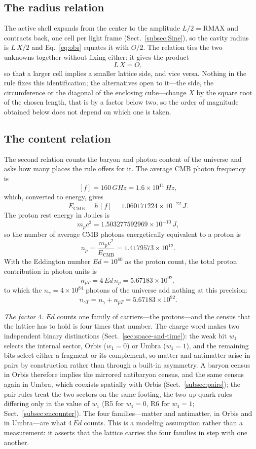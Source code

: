 \documentclass[a4paper]{article}
\begin{document}
\subsection{The radius relation}
The active shell expands from the center to the amplitude $L/2=\mathrm{RMAX}$ and contracts back, one cell per light frame (Sect.~\ref{subsec:Sine}), so the cavity radius is $L\,X/2$ and Eq.~\eqref{eq:obs} equates it with $O/2$.  The relation ties the two unknowns together without fixing either: it gives the product
\[
L\,X=O,
\]
so that a larger cell implies a smaller lattice side, and vice versa.  Nothing in the rule fixes this identification; the alternatives open to it---the side, the circumference or the diagonal of the enclosing cube---change $X$ by the square root of the chosen length, that is by a factor below two, so the order of magnitude obtained below does not depend on which one is taken.

\subsection{The content relation}
The second relation counts the baryon and photon content of the universe and asks how many places the rule offers for it.  The average CMB photon frequency~\cite{archeops} is
\[
[f]=160\,GHz=1.6\times10^{11}\,Hz,
\]
which, converted to energy, gives
\[
E_{\mathrm{CMB}}=h\,[f]=1.060171224\times10^{-22}\,J.
\]
The proton rest energy in Joules is
\[
m_{p}c^{2}=1.503277592969\times10^{-10}\,J,
\]
so the number of average CMB photons energetically equivalent to a proton is
\[
n_{p}=\frac{m_{p}c^{2}}{E_{\mathrm{CMB}}}=1.4179573\times10^{12}.
\]
With the Eddington number $Ed=10^{80}$ as the proton count, the total proton contribution in photon units is
\[
n_{pT}=4\,Ed\,n_{p}=5.67183\times10^{92},
\]
to which the $n_{\gamma}=4\times10^{84}$ photons of the universe add nothing at this precision:
\[
n_{\gamma T}=n_{\gamma}+n_{pT}=5.67183\times10^{92}.
\]

\emph{The factor $4$.}  $Ed$ counts one family of carriers---the protons---and the census that the lattice has to hold is four times that number.  The charge word makes two independent binary distinctions (Sect.~\ref{sec:space-and-time}): the weak bit $w_{1}$ selects the internal sector, Orbis ($w_{1}=0$) or Umbra ($w_{1}=1$), and the remaining bits select either a fragment or its complement, so matter and antimatter arise in pairs by construction rather than through a built-in asymmetry.  A baryon census in Orbis therefore implies the mirrored antibaryon census, and the same census again in Umbra, which coexists spatially with Orbis (Sect.~\ref{subsec:pairs}); the pair rules treat the two sectors on the same footing, the two up-quark rules differing only in the value of $w_{1}$ (R5 for $w_{1}=0$, R6 for $w_{1}=1$; Sect.~\ref{subsec:encounter}).  The four families---matter and antimatter, in Orbis and in Umbra---are what $4\,Ed$ counts.  This is a modeling assumption rather than a measurement: it asserts that the lattice carries the four families in step with one another.
\end{document}
